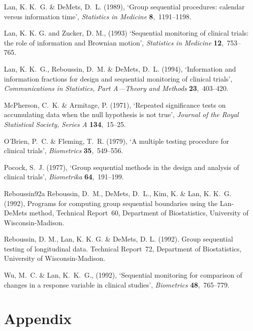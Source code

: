 \begin{thebibliography}{xx}
\item
Lan, K. K.~G. \& DeMets, D.~L.  (1989), `Group sequential procedures: calendar
  versus information time', {\em Statistics in Medicine} {\bf 8},~1191--1198.

\item
Lan, K. K. G. and Zucker, D. M., (1993) `Sequential monitoring of clinical
trials: the role of information and Brownian motion', {\em Statistics in
Medicine}  {\bf 12},~753--765.

\item
Lan, K. K.~G., Reboussin, D.~M. \& DeMets, D.~L.  (1994), `Information and
  information fractions for design and sequential monitoring of clinical
  trials', {\em Communications in Statistics, Part {A}---Theory and Methods}
  {\bf 23},~403--420.

\item
McPherson, C.~K. \& Armitage, P.  (1971), `Repeated significance tests on
  accumulating data when the null hypothesis is not true', {\em Journal of the
  Royal Statistical Society, Series {A}} {\bf 134},~15--25.

\item
O'Brien, P.~C. \& Fleming, T.~R.  (1979), `A multiple testing procedure for
  clinical trials', {\em Biometrics} {\bf 35},~549--556.

\item
Pocock, S.~J.  (1977), `Group sequential methods in the design and analysis of
  clinical trials', {\em Biometrika} {\bf 64},~191--199.

\item
{Reboussin92a}
Reboussin, D.~M., DeMets, D.~L., Kim, K. \& Lan, K. K.~G. (1992), Programs for
  computing group sequential boundaries using the {Lan-DeMets} method,
  Technical Report~60, Department of Biostatistics,
  University of Wisconsin-Madison.

\item
Reboussin, D. M., Lan, K. K. G. \& DeMets, D. L. (1992).
  Group sequential testing of longitudinal data.
  Technical Report~72, Department of Biostatistics,
  University of Wisconsin-Madison.

\item
  Wu, M.~C. \& Lan, K.~K.~G., (1992), `Sequential monitoring for comparison
  of changes in a response variable in clinical studies', {\em Biometrics}
  {\bf 48},~765--779.

\end{thebibliography}


\section*{Appendix}


